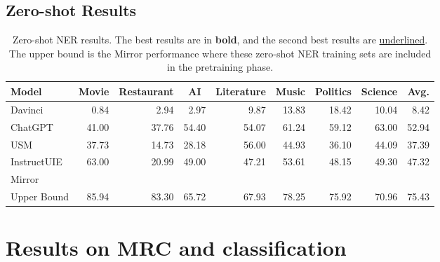 \subsection{Zero-shot Results}

\begin{table*}[t]
    \centering
    \begin{tabular}{lrrrrrrrr}
        \toprule
    Model &
      \multicolumn{1}{c}{Movie} &
      \multicolumn{1}{c}{Restaurant} &
      \multicolumn{1}{c}{AI} &
      \multicolumn{1}{c}{Literature} &
      \multicolumn{1}{c}{Music} &
      \multicolumn{1}{c}{Politics} &
      \multicolumn{1}{c}{Science} &
      \multicolumn{1}{c}{Avg.} \\
      \midrule
    Davinci          & 0.84           & 2.94           & 2.97           & 9.87           & 13.83          & 18.42          & 10.04          & 8.42           \\
    ChatGPT          &  41.00    & 37.76 & 54.40 &  54.07    & 61.24 &  59.12    & 63.00 & 52.94 \\
    USM              & 37.73          & 14.73          & 28.18          & 56.00 & 44.93          & 36.10          & 44.09          & 37.39          \\
    InstructUIE      & 63.00 &  20.99    & 49.00          & 47.21          & 53.61          & 48.15          & 49.30          & 47.32          \\
    Mirror &     \\
    \midrule
    Upper Bound      & 85.94          & 83.30          & 65.72          & 67.93          & 78.25          & 75.92          & 70.96          & 75.43 \\
    \bottomrule
    \end{tabular}%
    \caption{
        Zero-shot NER results.
        The best results are in \textbf{bold}, and the second best results are \underline{underlined}.
        The upper bound is the Mirror performance where these zero-shot NER training sets are included in the pretraining phase.
    }
    \label{tab:zero_shot_ner}
\end{table*}


\section{Results on MRC and classification}

